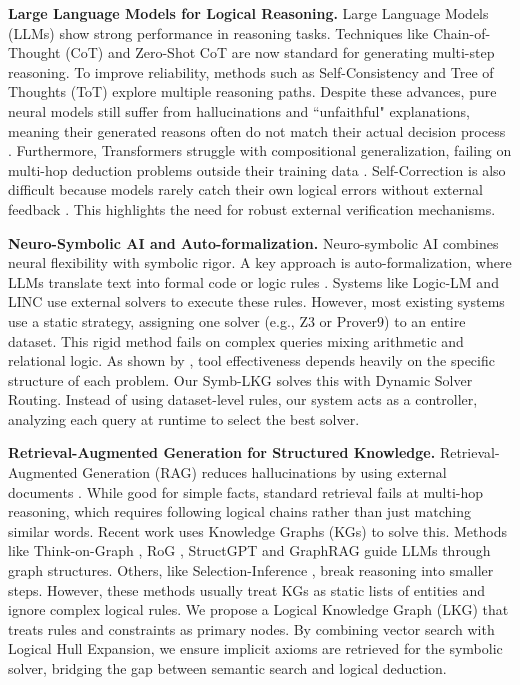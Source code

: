 \documentclass{article}
\theoremstyle{plain}
\theoremstyle{definition}
\theoremstyle{remark}
\begin{document}
\textbf{Large Language Models for Logical Reasoning.} 
Large Language Models (LLMs) show strong performance in reasoning tasks. Techniques like Chain-of-Thought (CoT) \cite{wei2022cot} and Zero-Shot CoT \cite{kojima2022zeroshot} are now standard for generating multi-step reasoning. To improve reliability, methods such as Self-Consistency \cite{Wang2022selfcon} and Tree of Thoughts (ToT) \cite{Yao2023tree} explore multiple reasoning paths. Despite these advances, pure neural models still suffer from hallucinations and ``unfaithful" explanations, meaning their generated reasons often do not match their actual decision process \cite{Turpin2023language}. Furthermore, Transformers struggle with compositional generalization, failing on multi-hop deduction problems outside their training data \cite{Dziri2023faith,Nye2021show}. Self-Correction is also difficult because models rarely catch their own logical errors without external feedback \cite{Huang2023large}. This highlights the need for robust external verification mechanisms.

\textbf{Neuro-Symbolic AI and Auto-formalization.}
Neuro-symbolic AI combines neural flexibility with symbolic rigor. A key approach is auto-formalization, where LLMs translate text into formal code \cite{Chen2022program,Gao2023pal} or logic rules \cite{Lyu2023faithful}. Systems like Logic-LM \cite{Pan2023logic} and LINC \cite{Olausson2023linc} use external solvers to execute these rules. However, most existing systems use a static strategy, assigning one solver (e.g., Z3 or Prover9) to an entire dataset. This rigid method fails on complex queries mixing arithmetic and relational logic. As shown by \cite{Lam2024closer}, tool effectiveness depends heavily on the specific structure of each problem. Our Symb-LKG solves this with Dynamic Solver Routing. Instead of using dataset-level rules, our system acts as a controller, analyzing each query at runtime to select the best solver.

\textbf{Retrieval-Augmented Generation for Structured Knowledge.} Retrieval-Augmented Generation (RAG) reduces hallucinations by using external documents \cite{Lewis2020retrieval,Guu2020retrieval}. While good for simple facts, standard retrieval fails at multi-hop reasoning, which requires following logical chains rather than just matching similar words. Recent work uses Knowledge Graphs (KGs) to solve this. Methods like Think-on-Graph \cite{Sun2023thinkongraph}, RoG \cite{Luo2023reasoningongraphs}, StructGPT \cite{Jiang2023StructGPT} and GraphRAG\cite{edge2024from}  guide LLMs through graph structures. Others, like Selection-Inference \cite{Creswell2022SelectionInference}, break reasoning into smaller steps. However, these methods usually treat KGs as static lists of entities and ignore complex logical rules. We propose a Logical Knowledge Graph (LKG) that treats rules and constraints as primary nodes. By combining vector search with Logical Hull Expansion, we ensure implicit axioms are retrieved for the symbolic solver, bridging the gap between semantic search and logical deduction.
\end{document}
